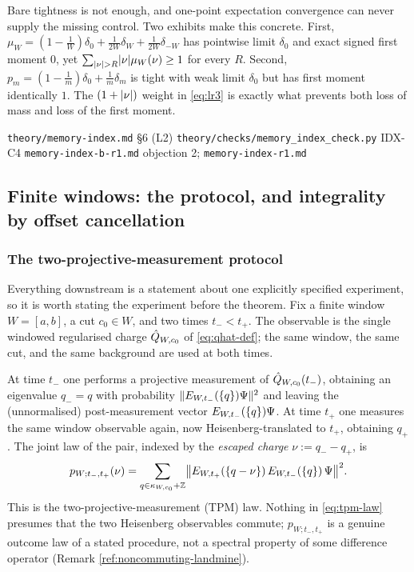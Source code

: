 \begin{remark}
\label{ref:why-first-moment-tight}
Bare tightness is not enough, and one-point expectation convergence can never
supply the missing control. Two exhibits make this concrete. First,
$\mu_W=(1-\tfrac1W)\delta_0+\tfrac{1}{2W}\delta_{W}+\tfrac{1}{2W}\delta_{-W}$
has pointwise limit $\delta_0$ and exact signed first moment $0$, yet
$\sum_{\lvert \nu\rvert>R}\lvert \nu\rvert\mu_W(\nu)\ge 1$ for every $R$. Second,
$p_m=(1-\tfrac1m)\delta_0+\tfrac1m\delta_m$ is tight with weak limit
$\delta_0$ but has first moment identically $1$. The $(1+\lvert \nu\rvert)$ weight
in \eqref{eq:lr3} is exactly what prevents both loss of mass and loss of the
first moment.
\end{remark}

{\texttt{theory/memory-index.md} \S6 (L2)}
{\texttt{theory/checks/memory\_index\_check.py} IDX-C4}
{\texttt{memory-index-b-r1.md} objection 2; \texttt{memory-index-r1.md}}

\subsection{Finite windows: the protocol, and integrality by offset
cancellation}

\subsubsection*{The two-projective-measurement protocol}

Everything downstream is a statement about one explicitly specified
experiment, so it is worth stating the experiment before the theorem. Fix a
finite window $W=[a,b]$, a cut $c_0\in W$, and two times $t_-<t_+$. The
observable is the single windowed regularised charge $\hat{Q}_{W,c_0}$ of
\eqref{eq:qhat-def}; the same window, the same cut, and the same background
are used at both times.

At time $t_-$ one performs a projective measurement of
$\hat{Q}_{W,c_0}(t_-)$, obtaining an eigenvalue $q_-=q$ with probability
$\lVert E_{W,t_-}(\{q\})\Psi\rVert^{2}$ and leaving the (unnormalised)
post-measurement vector $E_{W,t_-}(\{q\})\Psi$. At time $t_+$ one
measures the same window observable again, now Heisenberg-translated to
$t_+$, obtaining $q_+$. The joint law of the pair, indexed by the
\emph{escaped charge} $\nu:=q_--q_+$, is
\begin{equation}
  p_{W;t_-,t_+}(\nu)=\sum_{q\in\kappa_{W,c_0}+\mathbb{Z}}
   \bigl\lVert E_{W,t_+}(\{q-\nu\})\,
               E_{W,t_-}(\{q\})\,\Psi\bigr\rVert^{2}.
  \label{eq:tpm-law}
\end{equation}
This is the two-projective-measurement (TPM) law. Nothing in
\eqref{eq:tpm-law} presumes that the two Heisenberg observables commute;
$p_{W;t_-,t_+}$ is a genuine outcome law of a stated procedure, not a
spectral property of some difference operator (Remark
\ref{ref:noncommuting-landmine}).

